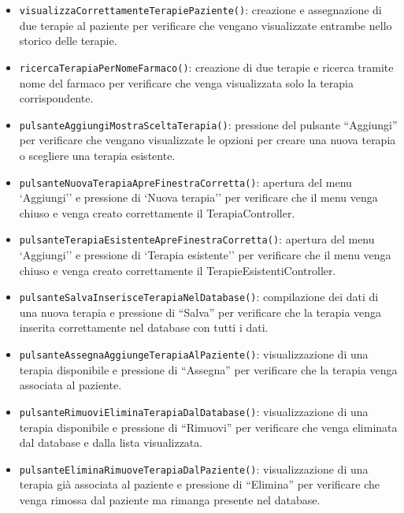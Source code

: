 \begin{itemize}
	
	\item \texttt{visualizzaCorrettamenteTerapiePaziente()}: creazione e assegnazione di due terapie al paziente per verificare che vengano visualizzate entrambe nello storico delle terapie.
	
	\item \texttt{ricercaTerapiaPerNomeFarmaco()}: creazione di due terapie e ricerca tramite nome del farmaco per verificare che venga visualizzata solo la terapia corrispondente.
	
	\item \texttt{pulsanteAggiungiMostraSceltaTerapia()}: pressione del pulsante ``Aggiungi'' per verificare che vengano visualizzate le opzioni per creare una nuova terapia o scegliere una terapia esistente.
	
	\item \texttt{pulsanteNuovaTerapiaApreFinestraCorretta()}: apertura del menu `Aggiungi'' e pressione di `Nuova terapia'' per verificare che il menu venga chiuso e venga creato correttamente il TerapiaController.
	
	\item \texttt{pulsanteTerapiaEsistenteApreFinestraCorretta()}: apertura del menu `Aggiungi'' e pressione di `Terapia esistente'' per verificare che il menu venga chiuso e venga creato correttamente il TerapieEsistentiController.
	
	\item \texttt{pulsanteSalvaInserisceTerapiaNelDatabase()}: compilazione dei dati di una nuova terapia e pressione di ``Salva'' per verificare che la terapia venga inserita correttamente nel database con tutti i dati.
	
	\item \texttt{pulsanteAssegnaAggiungeTerapiaAlPaziente()}: visualizzazione di una terapia disponibile e pressione di ``Assegna'' per verificare che la terapia venga associata al paziente.
	
	\item \texttt{pulsanteRimuoviEliminaTerapiaDalDatabase()}: visualizzazione di una terapia disponibile e pressione di ``Rimuovi'' per verificare che venga eliminata dal database e dalla lista visualizzata.
	
	\item \texttt{pulsanteEliminaRimuoveTerapiaDalPaziente()}: visualizzazione di una terapia già associata al paziente e pressione di ``Elimina'' per verificare che venga rimossa dal paziente ma rimanga presente nel database.
	
\end{itemize}

